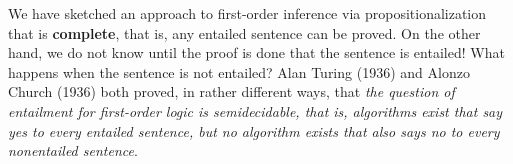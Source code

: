 We have sketched an approach to first-order inference via propositionalization that is \textbf{complete}, that is, any entailed sentence can be proved.  On the other hand, we do not know until the
proof is done that the sentence is entailed! What happens when the sentence is not entailed? Alan Turing (1936) and Alonzo Church (1936)
both proved, in rather different ways, that \textit{the question of entailment for first-order logic is semidecidable, that is, algorithms exist that say yes to every entailed sentence, but no algorithm exists that also says no to every nonentailed sentence}.


